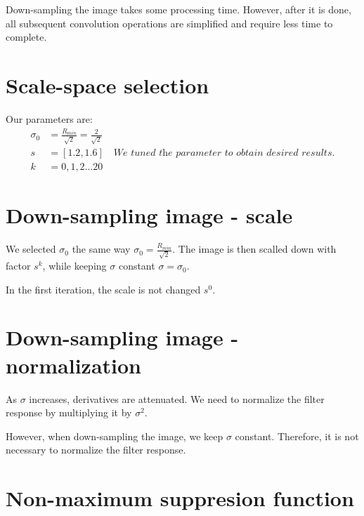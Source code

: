 \documentclass{article}
\begin{document}
Down-sampling the image takes some processing time. However, after it is done, all subsequent convolution operations are simplified and require less time to complete.

\section{Scale-space selection}
Our parameters are:
\begin{align*}
\sigma_0&=\frac{R_{min}}{\sqrt{2}}=\frac{2}{\sqrt{2}}\\
s&=[1.2,  1.6] \quad  \textit{We tuned the parameter to obtain desired results.}\\
k&=0,1,2...20
\end{align*}

\section{Down-sampling image - scale}
We selected $\sigma_0$ the same way $\sigma_0=\frac{R_{min}}{\sqrt{2}}$.
The image is then scalled down with factor $s^k$, while keeping $\sigma$ constant $\sigma=\sigma_0$.

In the first iteration, the scale is not changed $s^0$.

\section{Down-sampling image - normalization}
As $\sigma$ increases, derivatives are attenuated. We need to normalize the filter response by multiplying it by $\sigma^2$.

However, when down-sampling the image, we keep $\sigma$ constant. Therefore, it is not necessary to normalize the filter response.



\section{Non-maximum suppresion function}
\end{document}
